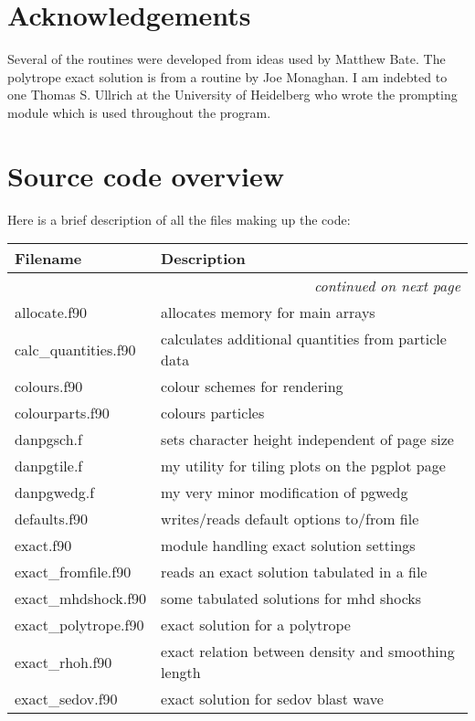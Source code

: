 \documentclass[a4paper,11pt]{article}
\begin{document}
\section*{Acknowledgements}
 Several of the routines were developed from ideas used by Matthew Bate. The
polytrope exact solution is from a routine by Joe Monaghan. I am indebted to one
Thomas S. Ullrich at the University of Heidelberg who wrote the prompting module
which is used throughout the program.

\newpage
\appendix

\section{Source code overview}
Here is a brief description of all the files making up the code:
\begin{longtable}{|lp{}|}
\hline
Filename & Description \\
\hline \endhead
\multicolumn{2}{|r|}{\emph{continued on next page}} \\
\hline \endfoot
\hline \endlastfoot
     allocate.f90           & allocates memory for main arrays \\
     calc\_quantities.f90    & calculates additional quantities from particle data \\
     colours.f90            & colour schemes for rendering\\
     colourparts.f90	 & colours particles\\
     danpgsch.f           & sets character height independent of page size\\
     danpgtile.f          & my utility for tiling plots on the pgplot page\\
     danpgwedg.f          & my very minor modification of pgwedg\\
     defaults.f90           & writes/reads default options to/from file\\
     exact.f90              & module handling exact solution settings\\
     exact\_fromfile.f90     & reads an exact solution tabulated in a file\\
     exact\_mhdshock.f90     & some tabulated solutions for mhd shocks\\ 
     exact\_polytrope.f90    & exact solution for a polytrope\\
     exact\_rhoh.f90	 & exact relation between density and smoothing length\\
     exact\_sedov.f90        & exact solution for sedov blast wave\\

\end{longtable}
\end{document}
